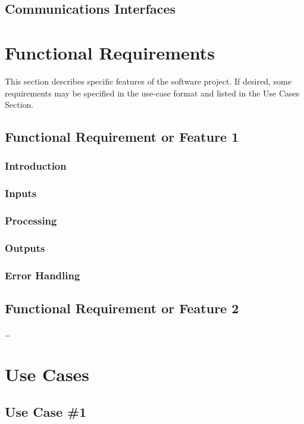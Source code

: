 \documentclass{scrreprt}
\begin{document}
		\subsection{Communications Interfaces}

	\section{Functional Requirements}
This section describes specific features of the software project.  If desired, some requirements may be specified in the use-case format and listed in the Use Cases Section.
		\subsection{Functional Requirement or Feature 1}

			\subsubsection{Introduction}

			\subsubsection{Inputs}

			\subsubsection{ Processing}

			\subsubsection{Outputs}

			\subsubsection{Error Handling}

		\subsection{ Functional Requirement or Feature 2}
…
	\section{Use Cases}

		\subsection{Use Case \#1}
\end{document}
